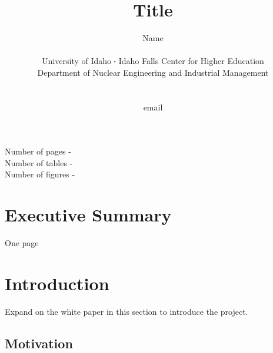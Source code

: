\documentclass[11pt,a4paper]{article}
\newcommand*\sq{\mathbin{\vcenter{\hbox{\rule{.3ex}{.3ex}}}}} %
\begin{document}
\begin{titlepage}
    \title{Title}
    \author{
        Name
        \\ \\
        University of Idaho $\sq$ Idaho Falls Center for Higher Education\\
        Department of Nuclear Engineering and Industrial Management
        \\ \\ \\
        email
    }
\clearpage %
\maketitle
\vspace*{\fill}
\begin{flushright}{
        \noindent Number of pages - \pageref{LastPage} \\
        \noindent Number of tables - \totaltables \\
        \noindent Number of figures - \totalfigures 
}
\end{flushright}
\thispagestyle{empty} %
\end{titlepage}


\thispagestyle{empty}


\onehalfspacing %


\linenumbers %
\modulolinenumbers[5] %


\section*{Executive Summary} \label{exec-summ}
One page


\newpage


\thispagestyle{fancy}
\setcounter{page}{1}


\section{Introduction} \label{sec-introduction}
Expand on the white paper in this section to introduce the project.

\subsection{Motivation}
\end{document}
